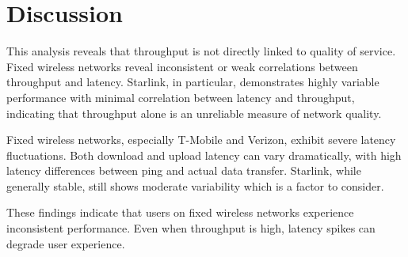 \section{Discussion} \label{sec:discussion}

This analysis reveals that throughput is not directly linked to quality of service. 
Fixed wireless networks reveal inconsistent or weak correlations between throughput 
and latency. Starlink, in particular, demonstrates highly variable performance with 
minimal correlation between latency and throughput, indicating that throughput alone 
is an unreliable measure of network quality.

Fixed wireless networks, especially T-Mobile and Verizon, exhibit severe latency fluctuations. 
Both download and upload latency can vary dramatically, with high latency differences 
between ping and actual data transfer. Starlink, while generally stable, still 
shows moderate variability which is a factor to consider. 

These findings indicate that users on fixed wireless networks experience inconsistent performance. 
Even when throughput is high, latency spikes can degrade user experience.
